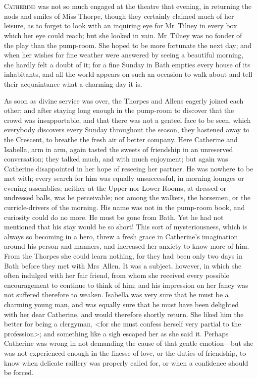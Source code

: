 \chapter[Chapter \thechapter]{} 
	
 \lettrine{C}{atherine} was not so much engaged at the theatre that evening, in returning the nods and smiles of Miss Thorpe, though they certainly claimed much of her leisure, as to forget to look with an inquiring eye for Mr~Tilney in every box which her eye could reach; but she looked in vain. Mr~Tilney was no fonder of the play than the pump-room. She hoped to be more fortunate the next day; and when her wishes for fine weather were answered by seeing a beautiful morning, she hardly felt a doubt of it; for a fine Sunday in Bath empties every house of its inhabitants, and all the world appears on such an occasion to walk about and tell their acquaintance what a charming day it is. 

 As soon as divine service was over, the Thorpes and Allens eagerly joined each other; and after staying long enough in the pump-room to discover that the crowd was insupportable, and that there was not a genteel face to be seen, which everybody discovers every Sunday throughout the season, they hastened away to the Crescent, to breathe the fresh air of better company. Here Catherine and Isabella, arm in arm, again tasted the sweets of friendship in an unreserved conversation; they talked much, and with much enjoyment; but again was Catherine disappointed in her hope of reseeing her partner. He was nowhere to be met with; every search for him was equally unsuccessful, in morning lounges or evening assemblies; neither at the Upper nor Lower Rooms, at dressed or undressed balls, was he perceivable; nor among the walkers, the horsemen, or the curricle-drivers of the morning. His name was not in the pump-room book, and curiosity could do no more. He must be gone from Bath. Yet he had not mentioned that his stay would be so short! This sort of mysteriousness, which is always so becoming in a hero, threw a fresh grace in Catherine's imagination around his person and manners, and increased her anxiety to know more of him. From the Thorpes she could learn nothing, for they had been only two days in Bath before they met with Mrs~Allen. It was a subject, however, in which she often indulged with her fair friend, from whom she received every possible encouragement to continue to think of him; and his impression on her fancy was not suffered therefore to weaken. Isabella was very sure that he must be a charming young man, and was equally sure that he must have been delighted with her dear Catherine, and would therefore shortly return. She liked him the better for being a clergyman, <for she must confess herself very partial to the profession>; and something like a sigh escaped her as she said it. Perhaps Catherine was wrong in not demanding the cause of that gentle emotion—but she was not experienced enough in the finesse of love, or the duties of friendship, to know when delicate raillery was properly called for, or when a confidence should be forced. 

